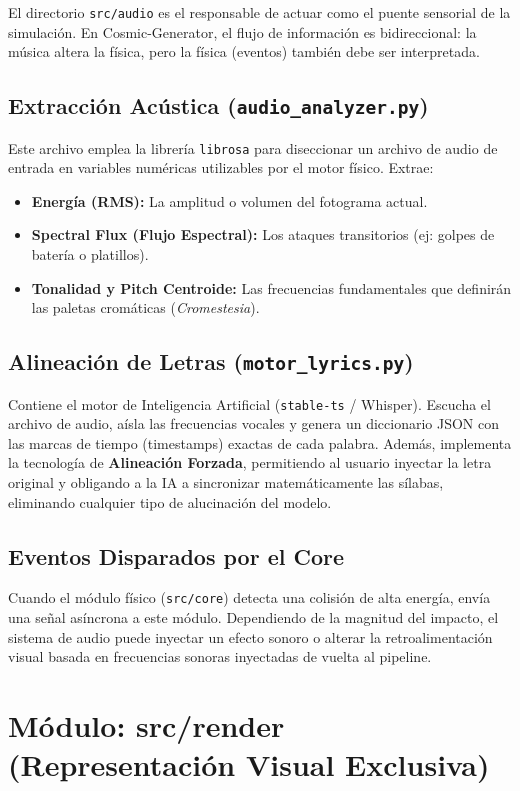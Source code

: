 \documentclass[12pt, openany]{book}
\begin{document}
El directorio \texttt{src/audio} es el responsable de actuar como el puente sensorial de la simulación. En Cosmic-Generator, el flujo de información es bidireccional: la música altera la física, pero la física (eventos) también debe ser interpretada.

\subsection{Extracción Acústica (\texttt{audio\_analyzer.py})}
Este archivo emplea la librería \texttt{librosa} para diseccionar un archivo de audio de entrada en variables numéricas utilizables por el motor físico. Extrae:
\begin{itemize}
    \item \textbf{Energía (RMS):} La amplitud o volumen del fotograma actual.
    \item \textbf{Spectral Flux (Flujo Espectral):} Los ataques transitorios (ej: golpes de batería o platillos).
    \item \textbf{Tonalidad y Pitch Centroide:} Las frecuencias fundamentales que definirán las paletas cromáticas (\textit{Cromestesia}).
\end{itemize}

\subsection{Alineación de Letras (\texttt{motor\_lyrics.py})}
Contiene el motor de Inteligencia Artificial (\texttt{stable-ts} / Whisper). Escucha el archivo de audio, aísla las frecuencias vocales y genera un diccionario JSON con las marcas de tiempo (timestamps) exactas de cada palabra. Además, implementa la tecnología de \textbf{Alineación Forzada}, permitiendo al usuario inyectar la letra original y obligando a la IA a sincronizar matemáticamente las sílabas, eliminando cualquier tipo de alucinación del modelo.

\subsection{Eventos Disparados por el Core}
Cuando el módulo físico (\texttt{src/core}) detecta una colisión de alta energía, envía una señal asíncrona a este módulo. Dependiendo de la magnitud del impacto, el sistema de audio puede inyectar un efecto sonoro o alterar la retroalimentación visual basada en frecuencias sonoras inyectadas de vuelta al pipeline.

\section{Módulo: src/render (Representación Visual Exclusiva)}
\end{document}
